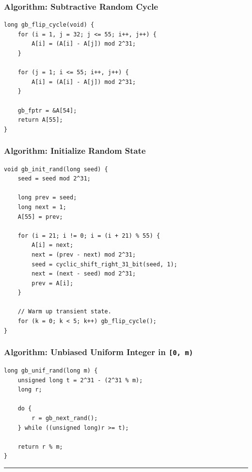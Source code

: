 \documentclass[11pt]{article}
\begin{document}
\subsubsection{Algorithm: Subtractive Random Cycle}\label{algorithm-subtractive-random-cycle}

\begin{verbatim}
long gb_flip_cycle(void) {
    for (i = 1, j = 32; j <= 55; i++, j++) {
        A[i] = (A[i] - A[j]) mod 2^31;
    }

    for (j = 1; i <= 55; i++, j++) {
        A[i] = (A[i] - A[j]) mod 2^31;
    }

    gb_fptr = &A[54];
    return A[55];
}
\end{verbatim}

\subsubsection{Algorithm: Initialize Random State}\label{algorithm-initialize-random-state}

\begin{verbatim}
void gb_init_rand(long seed) {
    seed = seed mod 2^31;

    long prev = seed;
    long next = 1;
    A[55] = prev;

    for (i = 21; i != 0; i = (i + 21) % 55) {
        A[i] = next;
        next = (prev - next) mod 2^31;
        seed = cyclic_shift_right_31_bit(seed, 1);
        next = (next - seed) mod 2^31;
        prev = A[i];
    }

    // Warm up transient state.
    for (k = 0; k < 5; k++) gb_flip_cycle();
}
\end{verbatim}

\subsubsection{\texorpdfstring{Algorithm: Unbiased Uniform Integer in \texttt{{[}0,\ m)}}{Algorithm: Unbiased Uniform Integer in {[}0, m)}}\label{algorithm-unbiased-uniform-integer-in-0-m}

\begin{verbatim}
long gb_unif_rand(long m) {
    unsigned long t = 2^31 - (2^31 % m);
    long r;

    do {
        r = gb_next_rand();
    } while ((unsigned long)r >= t);

    return r % m;
}
\end{verbatim}

\begin{center}\rule{0.5\linewidth}{0.5pt}\end{center}
\end{document}
